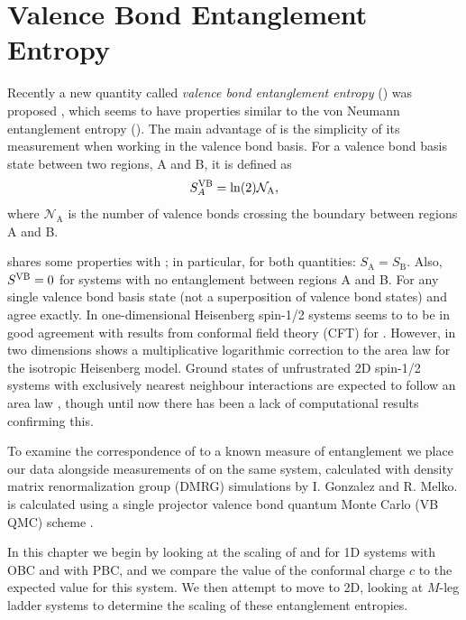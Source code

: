 \chapter{Valence Bond Entanglement Entropy}
Recently a new quantity called {\it{valence bond entanglement entropy}} (\vB) was proposed \cite{Ian1, Alet, Chh},  
which seems to have properties similar to the von Neumann entanglement entropy (\vN).
The main advantage of \vb is the simplicity of its measurement when working in the valence bond basis.
For a valence bond basis state \vb between two regions, A and B, it is defined as 
\begin{equation}
S^{\text{VB}}_A = \ln({2})\mathcal{N}_{\text{A}},
\end{equation} 
where $\mathcal{N}_{\text{A}}$ is the number of valence bonds crossing the boundary between
regions A and B.


\vb shares some properties with \vN; in particular, for both quantities: $S_{\text{A}} = S_{\text{B}}$.
Also, $S^{\text{VB}} = 0$ for systems with no entanglement between regions A and B.
For any single valence bond basis state (not a superposition of valence bond states) \vb and \vn agree exactly.
In one-dimensional Heisenberg spin-1/2 systems \vb seems to to be in good agreement with
results from conformal field theory (CFT) for \vN{} \cite{Alet}.
However, in two dimensions \vb shows a multiplicative logarithmic correction to the area law
for the isotropic Heisenberg model.  
Ground states of unfrustrated 2D spin-1/2 systems with exclusively nearest neighbour interactions
are expected to follow an area law \cite{ALreview, DeBeaudrap2010}, though until now there has been a lack of computational results confirming this.

To examine the correspondence of \vb to a known measure of entanglement  \cite{PRL1} we place our \vb data alongside measurements of \vn
on the same system, calculated with density matrix renormalization group (DMRG) \cite{Scholl05,White92} simulations by I. Gonzalez and R. Melko.
\vb is calculated using a single projector valence bond quantum Monte Carlo (VB QMC) scheme \cite{Sandvik2007, Sandvik_vbqmc}.

In this chapter we begin by looking at the scaling of \vb and \vn for 1D systems with OBC and with PBC, and we compare the value of the conformal charge $c$ to the expected value for this system.
We then attempt to move to 2D, looking at $M$-leg ladder systems to determine the scaling of these entanglement entropies.  

